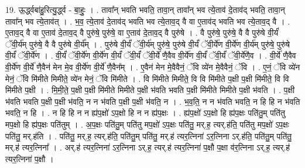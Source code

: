 \documentclass[17pt]{extarticle}
\begin{document}
19. ऊ॒र्द्ध्वबा॑हु॒रित्यु॒र्द्ध्व - बा॒हुः॒ । . तावा᳚न् भवति भवति॒ तावा॒न् तावा᳚न् भव त्ये॒ताव॑ दे॒ताव॑द् भवति॒ तावा॒न् तावा᳚न् भव त्ये॒ताव॑त् । . भ॒व॒ त्ये॒ताव॑ दे॒ताव॑द् भवति भव त्ये॒ताव॒द् वै वा ए॒ताव॑द् भवति भव त्ये॒ताव॒द् वै । . ए॒ताव॒द् वै वा ए॒ताव॑ दे॒ताव॒द् वै पुरु॑षे॒ पुरु॑षे॒ वा ए॒ताव॑ दे॒ताव॒द् वै पुरु॑षे । . वै पुरु॑षे॒ पुरु॑षे॒ वै वै पुरु॑षे वी॒र्यं॑ ॅवी॒र्य॑म् पुरु॑षे॒ वै वै पुरु॑षे वी॒र्य᳚म् । . पुरु॑षे वी॒र्यं॑ ॅवी॒र्य॑म् पुरु॑षे॒ पुरु॑षे वी॒र्यं॑ ॅवी॒र्ये॑ण वी॒र्ये॑ण वी॒र्य॑म् पुरु॑षे॒ पुरु॑षे वी॒र्यं॑ ॅवी॒र्ये॑ण । . वी॒र्यं॑ ॅवी॒र्ये॑ण वी॒र्ये॑ण वी॒र्यं॑ ॅवी॒र्यं॑ ॅवी॒र्ये॑ णै॒वैव वी॒र्ये॑ण वी॒र्यं॑ ॅवी॒र्यं॑ ॅवी॒र्ये॑णै॒व । . वी॒र्ये॑ णै॒वैव वी॒र्ये॑ण वी॒र्ये॑ णै॒वैन॑ मेन मे॒व वी॒र्ये॑ण वी॒र्ये॑ णै॒वैन᳚म् । . ए॒वैन॑ मेन मे॒वैवैनं॒ ॅवि व्ये॑न मे॒वैवैनं॒ ॅवि । . ए॒नं॒ ॅवि व्ये॑न मेनं॒ ॅवि मि॑मीते मिमीते॒ व्ये॑न मेनं॒ ॅवि मि॑मीते । . वि मि॑मीते मिमीते॒ वि वि मि॑मीते प॒क्षी प॒क्षी मि॑मीते॒ वि वि मि॑मीते प॒क्षी । . मि॒मी॒ते॒ प॒क्षी प॒क्षी मि॑मीते मिमीते प॒क्षी भ॑वति भवति प॒क्षी मि॑मीते मिमीते प॒क्षी भ॑वति । . प॒क्षी भ॑वति भवति प॒क्षी प॒क्षी भ॑वति॒ न न भ॑वति प॒क्षी प॒क्षी भ॑वति॒ न । . भ॒व॒ति॒ न न भ॑वति भवति॒ न हि हि न भ॑वति भवति॒ न हि । . न हि हि न न ह्य॑प॒क्षो॑ ऽप॒क्षो हि न न ह्य॑प॒क्षः । . ह्य॑प॒क्षो॑ ऽप॒क्षो हि ह्य॑प॒क्षः पति॑तु॒म् पति॑तु मप॒क्षो हि ह्य॑प॒क्षः पति॑तुम् । . अ॒प॒क्षः पति॑तु॒म् पति॑तु मप॒क्षो॑ ऽप॒क्षः पति॑तु॒ मर्.ह॒ त्यर्.ह॑ति॒ पति॑तु मप॒क्षो॑ ऽप॒क्षः पति॑तु॒ मर्.ह॑ति । . पति॑तु॒ मर्.ह॒ त्यर्.ह॑ति॒ पति॑तु॒म् पति॑तु॒ मर्.ह॑ त्यर॒त्निना॑ ऽर॒त्निना ऽर्.ह॑ति॒ पति॑तु॒म् पति॑तु॒ मर्.ह॑ त्यर॒त्निना᳚ । . अर्.ह॑ त्यर॒त्निना॑ ऽर॒त्निना ऽर्.ह॒ त्यर्.ह॑ त्यर॒त्निना॑ प॒क्षौ प॒क्षा व॑र॒त्निना ऽर्.ह॒ त्यर्.ह॑ त्यर॒त्निना॑ प॒क्षौ । \newline
\end{document}
